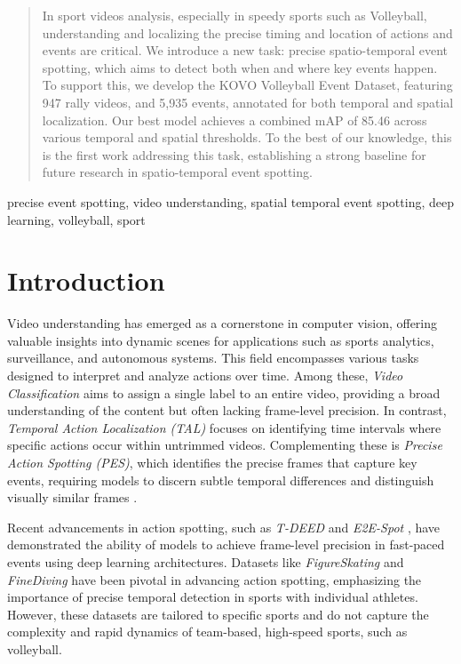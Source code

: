 \documentclass[conference]{IEEEtran}
\begin{document}
\begin{abstract}
    In sport videos analysis, especially in speedy sports such as Volleyball, understanding and localizing the precise timing and location of actions and events are critical. We introduce a new task: precise spatio-temporal event spotting, which aims to detect both when and where key events happen. To support this, we develop the KOVO Volleyball Event Dataset, featuring 947 rally videos, and 5,935 events, annotated for both temporal and spatial localization. Our best model achieves a combined mAP of 85.46 across various temporal and spatial thresholds.
     To the best of our knowledge, this is the first work addressing this task, establishing a strong baseline for future research in spatio-temporal event spotting.
\end{abstract}

\begin{IEEEkeywords}
precise event spotting, video understanding, spatial temporal event spotting, deep learning, volleyball, sport
\end{IEEEkeywords}

\section{Introduction}

Video understanding has emerged as a cornerstone in computer vision, offering valuable insights into dynamic scenes for applications such as sports analytics, surveillance, and autonomous systems. This field encompasses various tasks designed to interpret and analyze actions over time. Among these, \textit{Video Classification} aims to assign a single label to an entire video, providing a broad understanding of the content but often lacking frame-level precision. In contrast, \textit{Temporal Action Localization (TAL)} focuses on identifying time intervals where specific actions occur within untrimmed videos. Complementing these is \textit{Precise Action Spotting (PES)}, which identifies the precise frames that capture key events, requiring models to discern subtle temporal differences and distinguish visually similar frames \cite{spot22}.

Recent advancements in action spotting, such as \textit{T-DEED} \cite{tdeed23} and \textit{E2E-Spot} \cite{spot22}, have demonstrated the ability of models to achieve frame-level precision in fast-paced events using deep learning architectures. Datasets like \textit{FigureSkating} \cite{figureskating} and \textit{FineDiving} \cite{finediving} have been pivotal in advancing action spotting, emphasizing the importance of precise temporal detection in sports with individual athletes. However, these datasets are tailored to specific sports and do not capture the complexity and rapid dynamics of team-based, high-speed sports, such as volleyball.
\end{document}
